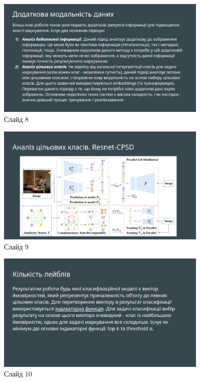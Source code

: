 \documentclass{udstu}
\begin{document}
\begin{figure}[!ht]
	\centering
	\includegraphics[width=0.9\textwidth]{PNG/present/present-8}
	\caption{Слайд 8}
\end{figure}

\begin{figure}[!ht]
	\centering
	\includegraphics[width=0.9\textwidth]{PNG/present/present-9}
	\caption{Слайд 9}
\end{figure}

\begin{figure}[!ht]
	\centering
	\includegraphics[width=0.9\textwidth]{PNG/present/present-10}
	\caption{Слайд 10}
\end{figure}
\end{document}
